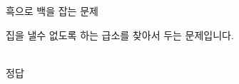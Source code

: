 \documentclass{article}	%
\begin{document}
\centering
\kg 흑으로 백을 잡는 문제\\[20pt]
\flushleft\hspace*{1.97cm}
\begin{minipage}{3.5cm}
\showgoban[a1,f10]
\end{minipage}
\begin{minipage}{3.5cm}
\kb 집을 낼수 없도록 하는 급소를 찾아서 두는 문제입니다.
\end{minipage}
\\[1em]
\centering
\kf 정답\\[.3cm]
\showgoban[a1,f10]\cleargobansymbols\quad
{}
\showgoban[a1,f10]\cleargobansymbols\quad
{}
\showgoban[a1,f10]%
\end{document}
